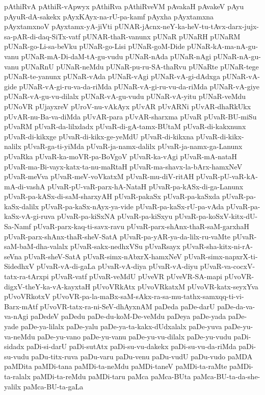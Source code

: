 {pAthiRvA
pAthiR-vApwyx
pAthiRva
pAthiRveVM
pAvakaH
pAvakeV
pAyu
pAyuR-dA-sakekx
pAyxKAyx-na-rU-pa-kamf
pAyxha
pAyxtamxna
pAyxtamxnoV
pAyxtamx-yA-jiVti
pUNAR-jAcnx-neY-ka-heV-tu-tAvx-darx-jujx-sa-pAR-di-daq-SiTx-vatf
pUNAR-thaR-vanunx
pUNaR
pUNaRH
pUNaRM
pUNaR-go-Li-sa-beVku
pUNaR-go-Lisi
pUNaR-goM-Dide
pUNaR-kA-ma-nA-gu-vanu
pUNaR-mA-Di-daM-tA-gu-vudu
pUNaR-nAda
pUNaR-nAgi
pUNaR-nA-gu-vanu
pUNaRnU
pUNaR-neMdu
pUNaR-pu-ru-SA-thaRvu
pUNaRte
pUNaR-tege
pUNaR-te-yanunx
pUNaR-vAda
pUNaR-vAgi
pUNaR-vA-gi-dAdxga
pUNaR-vA-gide
pUNaR-vA-gi-ru-va-da-riMda
pUNaR-vA-gi-ru-vu-da-riMda
pUNaR-vA-giye
pUNaR-vA-gu-vu-dilalx
pUNaR-vA-gu-vudu
pUNaR-vA-yitu
pUNaR-veMdu
pUNoVR
pUjayxreV
pUroV-nu-vAkAyx
pUvAR
pUvARNi
pUvAR-dhaRkUkx
pUvAR-nu-Ba-va-diMda
pUvAR-para
pUvAR-sharxma
pUvaR
pUvaR-BU-miSu
pUvaRM
pUvaR-da-lilxdadx
pUvaR-di-gA-tamx-BUtaM
pUvaR-di-kakxnunx
pUvaR-di-kikxge
pUvaR-di-kikx-ge-yeMdU
pUvaR-di-kikxna
pUvaR-di-kikx-nalilx
pUvaR-ga-ti-yiMda
pUvaR-ja-namx-dalilx
pUvaR-ja-namx-ga-Lanunx
pUvaRka
pUvaR-ka-moVR-pa-BoVgoV
pUvaR-ka-vAgi
pUvaR-mA-nataH
pUvaR-ma-Bi-vayx-katx-ta-nu-maRtaH
pUvaR-ma-shavx-la-bArx-hamxNeV
pUvaR-meVva
pUvaR-meV-voVkatxM
pUvaR-mu-diV-ritAH
pUvaR-pU-vaR-kA-mA-di-vashA
pUvaR-pU-vaR-parx-hA-NataH
pUvaR-pa-kASx-di-ga-Lanunx
pUvaR-pa-kASx-di-saM-sharxyAH
pUvaR-pakaSx
pUvaR-pa-kaSxda
pUvaR-pa-kaSx-dalilx
pUvaR-pa-kaSx-nAyx-ya-vide
pUvaR-pa-kaSx-rU-pa-vAda
pUvaR-pa-kaSx-vA-gi-ruva
pUvaR-pa-kiSxNA
pUvaR-pa-kiSxyu
pUvaR-pa-koSxV-kitx-dU-Sa-Namf
pUvaR-parx-kaq-ti-savx-ravu
pUvaR-parx-shAnx-thaR-saM-garxhaH
pUvaR-parx-shAnx-thaR-sheV-SatA
pUvaR-pa-yAR-ya-da-lilx-ru-vaMte
pUvaR-saM-baM-dha-valalx
pUvaR-sakx-nedhxVSu
pUvaRsayx
pUvaR-sha-kitx-ni-rA-seVna
pUvaR-sheV-SatA
pUvaR-simx-nAbxrX-hamxNeV
pUvaR-simx-napxrX-ti-SidedhxV
pUvaR-vA-di-gaLa
pUvaR-vA-diya
pUvaR-vA-diyu
pUvaR-va-cocxV-tatx-ra-tArxpi
pUvaR-vatf
pUvaR-veMdU
pUveVR
pUveVR-SA-mapi
pUvoVR-digxV-theY-ka-vA-kayxtaH
pUvoVRkAtx
pUvoVRkatxM
pUvoVR-katx-seyxYva
pUvoVRkotxV
pUvoVR-pa-la-maBx-saM-sAkx-ra-sa-mu-tathx-samxqq-ti-vi-Barx-mAtf
pUvoVR-tatx-ra-ni-SeV-dhAyxnAM
paDeda
paDe-darU
paDe-da-va-va-nAgi
paDedeV
paDedu
paDe-du-koM-De-veMdu
paDeya
paDe-yada
paDe-yade
paDe-ya-lilalx
paDe-yalu
paDe-ya-ta-kakx-dUdxalalx
paDe-yuva
paDe-yu-va-neMdu
paDe-yu-vano
paDe-yu-vanu
paDe-yu-vu-dilalx
paDe-yu-vudu
paDi-sidadx
paDi-si-darU
paDi-sutAtx
paDi-su-vu-dakekx
paDi-su-vu-da-riMda
paDi-su-vudu
paDu-titx-ruva
paDu-varu
paDu-venu
paDu-vudU
paDu-vudo
paMDA
paMDita
paMDi-tana
paMDi-ta-neMdu
paMDi-taneV
paMDi-ta-raMte
paMDi-ta-ralalx
paMDi-ta-reMdu
paMDi-taru
paMca
paMca-BUta
paMca-BU-ta-da-she-yalilx
paMca-BU-ta-gaLa
}
